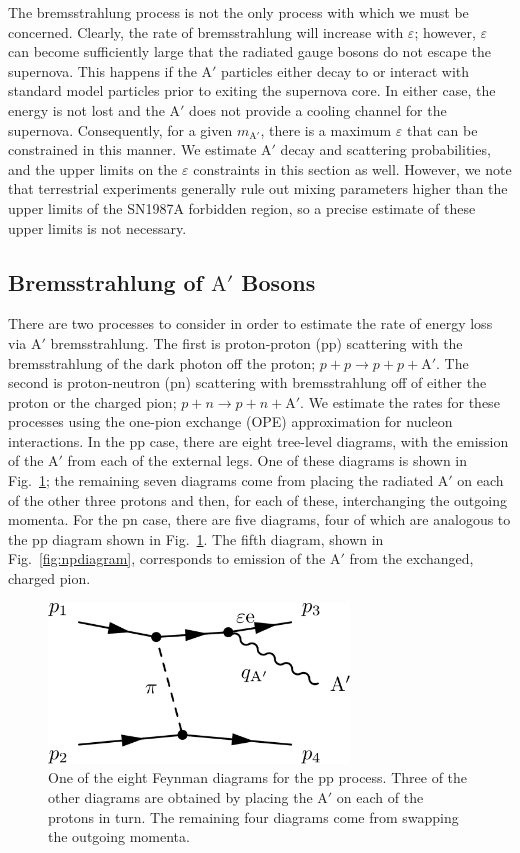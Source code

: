 \documentclass[nofootinbib,prd,superscriptaddress,twocolumn]{revtex4}
\newcommand{\Aprime}{\mathrm{A}'}
\begin{document}
The bremsstrahlung process is not the only process with which we must be concerned. Clearly, the rate of 
bremsstrahlung will increase with $\varepsilon$; however, $\varepsilon$ can become sufficiently large 
that the radiated gauge bosons do not escape the supernova. This happens if the $\Aprime$ particles 
either decay to or interact with standard model particles prior to exiting the supernova core. 
In either case, the energy is not lost and the $\Aprime$ does not provide a cooling channel for the supernova. 
Consequently, for a given $m_{\Aprime}$, there is a maximum $\varepsilon$ that can be constrained in this 
manner. We estimate $\Aprime$ decay and scattering probabilities, and the upper limits on the $\varepsilon$ 
constraints in this section as well. However, we note that terrestrial experiments generally rule out 
mixing parameters higher than the upper limits of the SN1987A forbidden region, so a precise estimate 
of these upper limits is not necessary.

\subsection{Bremsstrahlung of $\Aprime$ Bosons}

There are two processes to consider in order to estimate the rate of energy loss via $\Aprime$ bremsstrahlung. The first is  
proton-proton (pp) scattering with the bremsstrahlung of the dark photon off the proton; $p+p \rightarrow p+p+\Aprime$. 
The second is proton-neutron (pn) scattering with bremsstrahlung off of either the proton or the charged pion; 
$p+n \rightarrow p+n+\Aprime$. We estimate the rates for these processes using the one-pion exchange (OPE) 
approximation for nucleon interactions. In the pp case, there are eight tree-level diagrams, 
with the emission of the $\Aprime$ from each of the external legs. One of these diagrams is shown 
in Fig.~\ref{fig:ppdiagram}; the remaining seven diagrams come from placing the radiated $\Aprime$ 
on each of the other three protons and then, for each of these, interchanging the outgoing momenta. 
For the pn case, there are five diagrams, four of which are analogous to the pp diagram shown in 
Fig.~\ref{fig:ppdiagram}. The fifth diagram, shown in Fig.~\ref{fig:npdiagram}, corresponds to 
emission of the $\Aprime$ from the exchanged, charged pion.

\begin{figure}
\includegraphics[width=8cm]{ppdiagram.pdf}
\caption{One of the eight Feynman diagrams for the pp process. Three of the other diagrams are obtained by 
placing the $\Aprime$ on each of the protons in turn. The remaining four diagrams come from swapping the outgoing 
momenta.}
\label{fig:ppdiagram}
\end{figure}
\end{document}
